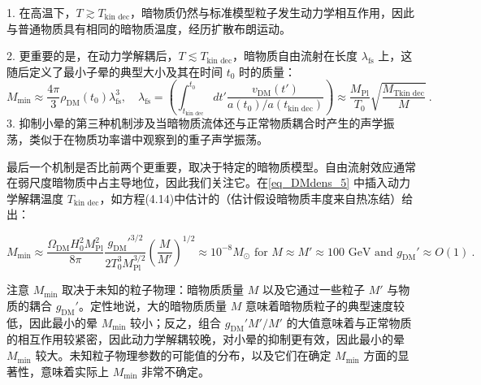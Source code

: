 1. 在高温下，\( T \gtrsim T_{\text{kin dec}} \)，暗物质仍然与标准模型粒子发生动力学相互作用，因此与普通物质具有相同的暗物质温度，经历扩散布朗运动。

2. 更重要的是，在动力学解耦后，\( T \lesssim T_{\text{kin dec}} \)，暗物质自由流射在长度 \( \lambda_{\text{fs}} \) 上，这随后定义了最小子晕的典型大小及其在时间 \( t_0 \) 时的质量：
\begin{equation}\label{eq_DMdens_5}
M_{\text{min}} \approx \frac{4\pi}{3} \rho_{\text{DM}}(t_0) \lambda_{\text{fs}}^3, \quad \lambda_{\text{fs}} = \left( \int_{t_{\text{kin dec}}}^{t_0} dt' \frac{v_{\text{DM}}(t')}{a(t_0)/a(t_{\text{kin dec}})} \right) \approx \frac{M_{\text{Pl}}}{T_0} \sqrt{\frac{M_{\text{Tkin dec}}}{M}}~. 
\end{equation}
3. 抑制小晕的第三种机制涉及当暗物质流体还与正常物质耦合时产生的声学振荡，类似于在物质功率谱中观察到的重子声学振荡。

最后一个机制是否比前两个更重要，取决于特定的暗物质模型。自由流射效应通常在弱尺度暗物质中占主导地位，因此我们关注它。在\autoref{eq_DMdens_5} 中插入动力学解耦温度 \( T_{\text{kin dec}} \)，如方程(4.14)中估计的（估计假设暗物质丰度来自热冻结）给出：

\[ M_{\text{min}} \approx \frac{\Omega_{\text{DM}} H_0^2 M_{\text{Pl}}^2}{8\pi} \frac{g_{\text{DM}}'^{3/2}}{2T_0^3 M_{\text{Pl}}^{3/2}} \left(\frac{M}{M'}\right)^{1/2} \approx 10^{-8} M_\odot \text{ for } M \approx M' \approx 100 \text{ GeV and } g_{\text{DM}}' \approx O(1)~. \]

注意 \( M_{\text{min}} \) 取决于未知的粒子物理：暗物质质量 \( M \) 以及它通过一些粒子 \( M' \) 与物质的耦合 \( g_{\text{DM}}' \)。定性地说，大的暗物质质量 \( M \) 意味着暗物质粒子的典型速度较低，因此最小的晕 \( M_{\text{min}} \) 较小；反之，组合 \( g_{\text{DM}}' M'/M' \) 的大值意味着与正常物质的相互作用较紧密，因此动力学解耦较晚，对小晕的抑制更有效，因此最小的晕 \( M_{\text{min}} \) 较大。未知粒子物理参数的可能值的分布，以及它们在确定 \( M_{\text{min}} \) 方面的显著性，意味着实际上 \( M_{\text{min}} \) 非常不确定。
 







